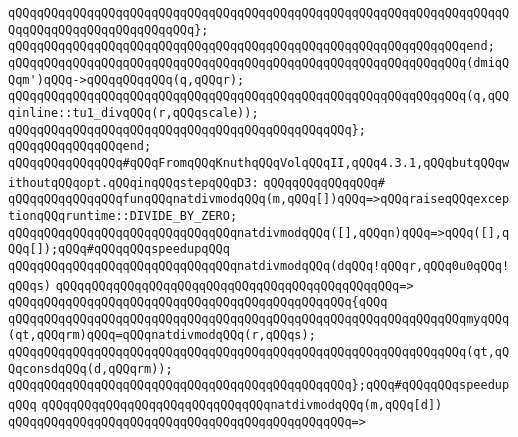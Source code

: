 \verb|qQQqqQQqqQQqqQQqqQQqqQQqqQQqqQQqqQQqqQQqqQQqqQQqqQQqqQQqqQQqqQQqqQQqqQQqqQQqqQQqqQQqqQQqqQQqqQQq};|\newline
\verb|qQQqqQQqqQQqqQQqqQQqqQQqqQQqqQQqqQQqqQQqqQQqqQQqqQQqqQQqqQQqqQQqend;|\newline
\newline
\verb|qQQqqQQqqQQqqQQqqQQqqQQqqQQqqQQqqQQqqQQqqQQqqQQqqQQqqQQqqQQqqQQq(dmiqQQqm')qQQq->qQQqqQQqqQQq(q,qQQqr);|\newline
\newline
\verb|qQQqqQQqqQQqqQQqqQQqqQQqqQQqqQQqqQQqqQQqqQQqqQQqqQQqqQQqqQQqqQQq(q,qQQqinline::tu1_divqQQq(r,qQQqscale));|\newline
\verb|qQQqqQQqqQQqqQQqqQQqqQQqqQQqqQQqqQQqqQQqqQQqqQQq};|\newline
\verb|qQQqqQQqqQQqqQQqend;|\newline
\newline
\verb|qQQqqQQqqQQqqQQq#qQQqFromqQQqKnuthqQQqVolqQQqII,qQQq4.3.1,qQQqbutqQQqwithoutqQQqopt.qQQqinqQQqstepqQQqD3:|\newline
\verb|qQQqqQQqqQQqqQQq#|\newline
\verb|qQQqqQQqqQQqqQQqfunqQQqnatdivmodqQQq(m,qQQq[])qQQq=>qQQqraiseqQQqexceptionqQQqruntime::DIVIDE_BY_ZERO;|\newline
\newline
\verb|qQQqqQQqqQQqqQQqqQQqqQQqqQQqqQQqnatdivmodqQQq([],qQQqn)qQQq=>qQQq([],qQQq[]);qQQq#qQQqqQQqspeedupqQQq|\newline
\newline
\verb|qQQqqQQqqQQqqQQqqQQqqQQqqQQqqQQqnatdivmodqQQq(dqQQq!qQQqr,qQQq0u0qQQq!qQQqs)|\newline
\verb|qQQqqQQqqQQqqQQqqQQqqQQqqQQqqQQqqQQqqQQqqQQqqQQq=>|\newline
\verb|qQQqqQQqqQQqqQQqqQQqqQQqqQQqqQQqqQQqqQQqqQQqqQQq{qQQq|\newline
\verb|qQQqqQQqqQQqqQQqqQQqqQQqqQQqqQQqqQQqqQQqqQQqqQQqqQQqqQQqqQQqqQQqmyqQQq(qt,qQQqrm)qQQq=qQQqnatdivmodqQQq(r,qQQqs);|\newline
\verb|qQQqqQQqqQQqqQQqqQQqqQQqqQQqqQQqqQQqqQQqqQQqqQQqqQQqqQQqqQQqqQQq(qt,qQQqconsdqQQq(d,qQQqrm));|\newline
\verb|qQQqqQQqqQQqqQQqqQQqqQQqqQQqqQQqqQQqqQQqqQQqqQQq};qQQq#qQQqqQQqspeedupqQQq|\newline
\newline
\verb|qQQqqQQqqQQqqQQqqQQqqQQqqQQqqQQqnatdivmodqQQq(m,qQQq[d])|\newline
\verb|qQQqqQQqqQQqqQQqqQQqqQQqqQQqqQQqqQQqqQQqqQQqqQQq=>|\newline

